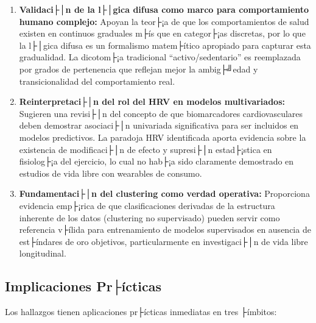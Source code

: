 \begin{enumerate}
    \item \textbf{Validaci├│n de la l├│gica difusa como marco para comportamiento humano complejo:} Apoyan la teor├¡a de que los comportamientos de salud existen en continuos graduales m├ís que en categor├¡as discretas, por lo que la l├│gica difusa es un formalismo matem├ítico apropiado para capturar esta gradualidad. La dicotom├¡a tradicional ``activo/sedentario'' es reemplazada por grados de pertenencia que reflejan mejor la ambig├╝edad y transicionalidad del comportamiento real.
    
    \item \textbf{Reinterpretaci├│n del rol del HRV en modelos multivariados:} Sugieren una revisi├│n del concepto de que biomarcadores cardiovasculares deben demostrar asociaci├│n univariada significativa para ser incluidos en modelos predictivos. La paradoja HRV identificada aporta evidencia sobre la existencia de modificaci├│n de efecto y supresi├│n estad├¡stica en fisiolog├¡a del ejercicio, lo cual no hab├¡a sido claramente demostrado en estudios de vida libre con wearables de consumo.
    
    \item \textbf{Fundamentaci├│n del clustering como verdad operativa:} Proporciona evidencia emp├¡rica de que clasificaciones derivadas de la estructura inherente de los datos (clustering no supervisado) pueden servir como referencia v├ílida para entrenamiento de modelos supervisados en ausencia de est├índares de oro objetivos, particularmente en investigaci├│n de vida libre longitudinal.
\end{enumerate}

\subsection{Implicaciones Pr├ícticas}
\label{subsec:implicaciones_practicas}

Los hallazgos tienen aplicaciones pr├ícticas inmediatas en tres ├ímbitos:

